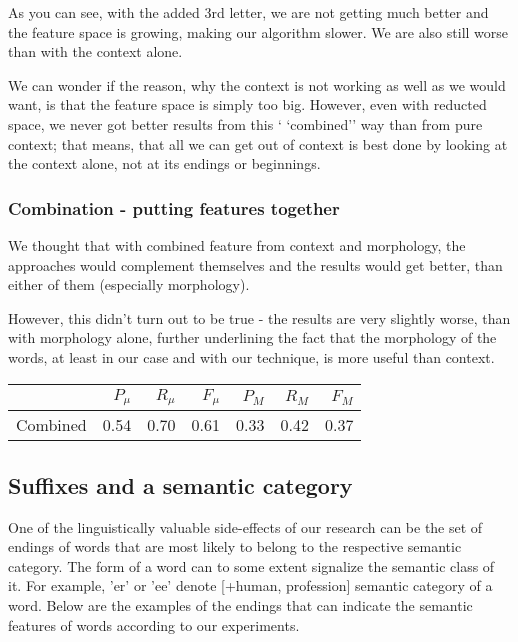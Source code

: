 \documentclass[letterpaper]{article}
\begin{document}
As you can see, with the added 3rd letter, we are not getting much better and 
the feature space is growing, making our algorithm slower. We are also still worse than with the context alone.


We can wonder if the reason, why the context is not working as 
well as we would want, is that the feature space is simply too big. 
However, even with reducted space, we never got better results from this `
`combined'' way than from pure context; that means, that all we can get out of context 
is best done by looking at the context alone, not at its endings or beginnings.

\subsubsection{Combination - putting features together}
We thought that with combined feature from context and morphology, the approaches would complement 
themselves and the results would get better, than either of them (especially morphology).

However, this didn't turn out to be true - the results are very slightly worse, than with morphology alone, 
further underlining the fact that the morphology of the words, at least in our case and with our technique, 
is more useful than context.

\begin{tabular}{|r|r|r|r|r|r|r|}
 \hline
 & $P_\mu$ & $R_\mu$ & $F_\mu$ & $P_M$ & $R_M$  & $F_M$ \\ \hline
Combined & 0.54 & 0.70 & 0.61 & 0.33 & 0.42 & 0.37 \\ \hline
\end{tabular}


\subsection{Suffixes and a semantic category}
One of the linguistically valuable side-effects of our research can be 
the set of endings of words that are most likely to belong to the
respective semantic category.
The form of a word can to some extent signalize the semantic class of it. 
For example, 'er' or 'ee' denote [+human, profession] semantic category of a word.
Below are the examples of the endings that
can indicate the semantic features of words according to our experiments.
\end{document}
